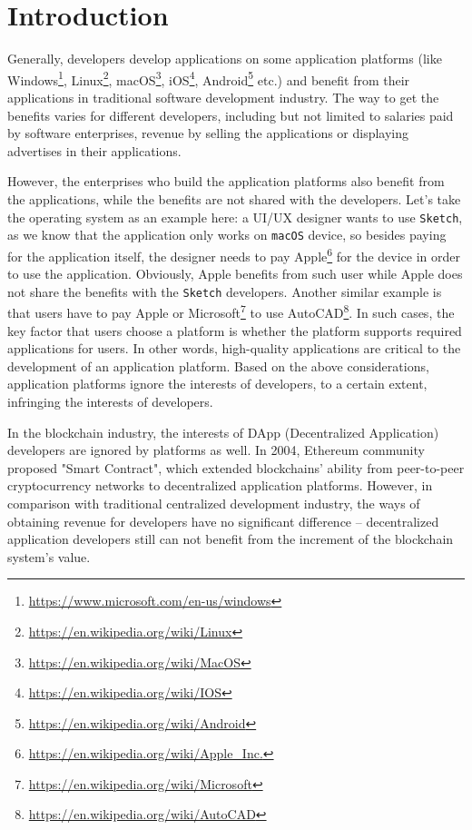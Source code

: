 \section{Introduction}

Generally, developers develop applications on some application platforms (like
Windows\footnote{\url{https://www.microsoft.com/en-us/windows}}, Linux\footnote{\url{https://en.wikipedia.org/wiki/Linux}},
macOS\footnote{\url{https://en.wikipedia.org/wiki/MacOS}},
iOS\footnote{\url{https://en.wikipedia.org/wiki/IOS}},
Android\footnote{\url{https://en.wikipedia.org/wiki/Android}} etc.) and
benefit from their applications in traditional software development industry.
The way to get the benefits varies for different developers, including but not
limited to salaries paid by software enterprises, revenue by selling the
applications or displaying advertises in their applications.

However, the enterprises who build the application platforms also benefit
from the applications, while the benefits are not shared with the developers. 
Let's take the operating system as an example here: a UI/UX designer wants to use \texttt{Sketch}, 
as we know that the application only works on \texttt{macOS} device, so besides
paying for the application itself, the designer needs to pay Apple\footnote{\url{https://en.wikipedia.org/wiki/Apple_Inc.}} 
for the device in order to use the application. Obviously, Apple benefits from such user while
Apple does not share the benefits with the \texttt{Sketch} developers. 
Another similar example is that users have to pay Apple or
Microsoft\footnote{\url{https://en.wikipedia.org/wiki/Microsoft}} to use
AutoCAD\footnote{\url{https://en.wikipedia.org/wiki/AutoCAD}}. In such cases,
the key factor that users choose a platform is whether the platform
supports required applications for users. In other words, high-quality
applications are critical to the development of an application platform. Based on the above considerations,  application platforms ignore the interests of developers, to a certain extent, infringing the interests of developers.

In the blockchain industry, the interests of 
DApp (Decentralized Application) developers are ignored by platforms  as  well.
 In 2004, Ethereum community proposed "Smart Contract", 
which extended blockchains' ability from peer-to-peer
cryptocurrency networks to decentralized application platforms. However, in comparison with traditional centralized development industry, the ways of obtaining revenue for developers have no significant difference -- decentralized application developers still can not benefit
 from the increment of the blockchain system's value.


